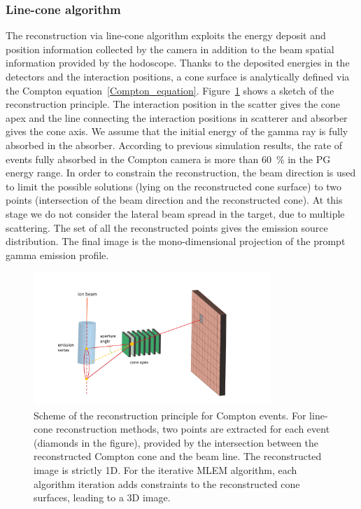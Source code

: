 \subsubsection{Line-cone algorithm}\label{chap4::subsubsec::line_cone}
The reconstruction via line-cone algorithm exploits the energy deposit and position information collected by the camera in addition to the beam spatial information provided by the hodoscope. Thanks to the deposited energies in the detectors and the interaction positions, a cone surface is analytically defined via the Compton equation~\ref{Compton_equation}. Figure~\ref{chap4::fig::fig:reconstruction_scheme} shows a sketch of the reconstruction principle. The interaction position in the scatter gives the cone apex and the line connecting the interaction positions in scatterer and absorber gives the cone axis. We assume that the initial energy of the gamma ray is fully absorbed in the absorber. According to previous simulation results, the rate of events fully absorbed in the Compton camera is more than 60~\% in the PG energy range. In order to constrain the reconstruction, the beam direction is used to limit the possible solutions (lying on the reconstructed cone surface) to two points (intersection of the beam direction and the reconstructed cone). At this stage we do not consider the lateral beam spread in the target, due to multiple scattering. The set of all the reconstructed points gives the emission source distribution. The final image is the mono-dimensional projection of the prompt gamma emission profile. 

\begin{figure}
\centering
  \includegraphics[width=0.8\textwidth]{03_GraphicFiles/chapter4_HTsimu/reconstruction_scheme}
  \caption{Scheme of the reconstruction principle for Compton events. For line-cone reconstruction methods, two points are extracted for each event (diamonds in the figure), provided by the intersection between the reconstructed Compton cone and the beam line. The reconstructed image is strictly 1D. For the iterative MLEM algorithm, each algorithm iteration adds constraints to the reconstructed cone surfaces, leading to  a 3D image.}	
  \label{chap4::fig::fig:reconstruction_scheme}
\end{figure}


